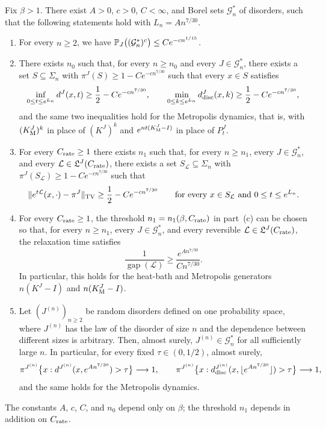 \begin{theorem}\label{thm:barrier-strong}
Fix $\beta>1$. There exist $A>0$, $c>0$, $C<\infty$, and Borel sets $\mathcal G_n^*$ of disorders, such that the following statements hold with $L_n=An^{7/30}$.
\begin{enumerate}[label=\textup{(\alph*)}]
\item For every $n\ge2$, we have $\mathbb P_J\bigl((\mathcal G_n^*)^c\bigr)\le Ce^{-cn^{1/15}}$.
\item There exists $n_0$ such that, for every $n\ge n_0$ and every $J\in\mathcal G_n^*$, there exists a set $S\subseteq\Sigma_n$ with $\pi^J(S)\ge1-Ce^{-cn^{7/30}}$ such that every $x\in S$ satisfies
\[
 \inf_{0\le t\le e^{L_n}}d^J(x,t)\ge\frac12-Ce^{-cn^{7/30}},\qquad
 \min_{0\le k\le e^{L_n}}d^J_{\rm disc}(x,k)\ge\frac12-Ce^{-cn^{7/30}},
\]
and the same two inequalities hold for the Metropolis dynamics, that is, with $(K^J_{\rm M})^k$ in place of $(K^J)^k$ and $e^{nt(K^J_{\rm M}-I)}$ in place of $P^J_t$.
\item For every $C_{\rm rate}\ge1$ there exists $n_1$ such that, for every $n\ge n_1$, every $J\in\mathcal G_n^*$, and every $\mathcal L\in\mathfrak L^J(C_{\rm rate})$, there exists a set $S_{\mathcal L}\subseteq\Sigma_n$ with $\pi^J(S_{\mathcal L})\ge1-Ce^{-cn^{7/30}}$ such that
\[
 \lVert e^{t\mathcal L}(x,\cdot)-\pi^J\rVert_{\mathrm{TV}}\ge\frac12-Ce^{-cn^{7/30}}\qquad\text{for every }x\in S_{\mathcal L}\text{ and }0\le t\le e^{L_n}.
\]
\item For every $C_{\rm rate}\ge1$, the threshold $n_1=n_1(\beta,C_{\rm rate})$ in part~(c) can be chosen so that, for every $n\ge n_1$, every $J\in\mathcal G_n^*$, and every reversible $\mathcal L\in\mathfrak L^J(C_{\rm rate})$, the relaxation time satisfies
\[
 \frac1{\operatorname{gap}(\mathcal L)}\ge\frac{e^{An^{7/30}}}{Cn^{7/30}}.
\]
In particular, this holds for the heat-bath and Metropolis generators $n(K^J-I)$ and $n(K^J_{\rm M}-I)$.
\item Let $(J^{(n)})_{n\ge2}$ be random disorders defined on one probability space, where $J^{(n)}$ has the law of the disorder of size $n$ and the dependence between different sizes is arbitrary. Then, almost surely, $J^{(n)}\in\mathcal G_n^*$ for all sufficiently large $n$. In particular, for every fixed $\tau\in(0,1/2)$, almost surely,
\[
 \pi^{J^{(n)}}\bigl\{x:d^{J^{(n)}}(x,e^{An^{7/30}})>\tau\bigr\}\longrightarrow1,\qquad
 \pi^{J^{(n)}}\bigl\{x:d^{J^{(n)}}_{\rm disc}(x,\lfloor e^{An^{7/30}}\rfloor)>\tau\bigr\}\longrightarrow1,
\]
and the same holds for the Metropolis dynamics.
\end{enumerate}
The constants $A$, $c$, $C$, and $n_0$ depend only on $\beta$; the threshold $n_1$ depends in addition on $C_{\rm rate}$.
\end{theorem}

